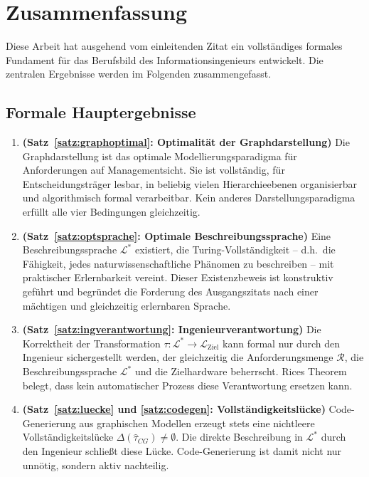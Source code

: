 ﻿\documentclass[a4paper,12pt]{article}
\theoremstyle{definition}
\begin{document}
\section{Zusammenfassung}
\label{sec:zusammenfassung}

Diese Arbeit hat ausgehend vom einleitenden Zitat ein vollständiges formales
Fundament für das Berufsbild des Informationsingenieurs entwickelt.
Die zentralen Ergebnisse werden im Folgenden zusammengefasst.

\subsection{Formale Hauptergebnisse}

\begin{enumerate}
  \item \textbf{(Satz~\ref{satz:graphoptimal}: Optimalität der Graphdarstellung)}
        Die Graphdarstellung ist das optimale Modellierungsparadigma für Anforderungen
        auf Managementsicht. Sie ist vollständig, für Entscheidungsträger lesbar,
        in beliebig vielen Hierarchieebenen organisierbar und algorithmisch formal
        verarbeitbar. Kein anderes Darstellungsparadigma erfüllt alle vier Bedingungen
        gleichzeitig.

  \item \textbf{(Satz~\ref{satz:optsprache}: Optimale Beschreibungssprache)}
        Eine Beschreibungssprache $\mathcal{L}^*$ existiert, die Turing-Vollständigkeit
        -- d.h.\ die Fähigkeit, jedes naturwissenschaftliche Phänomen zu beschreiben --
        mit praktischer Erlernbarkeit vereint. Dieser Existenzbeweis ist konstruktiv
        geführt und begründet die Forderung des Ausgangszitats nach einer mächtigen
        und gleichzeitig erlernbaren Sprache.

  \item \textbf{(Satz~\ref{satz:ingverantwortung}: Ingenieurverantwortung)}
        Die Korrektheit der Transformation $\tau: \mathcal{L}^* \to \mathcal{L}_{\text{Ziel}}$
        kann formal nur durch den Ingenieur sichergestellt werden, der gleichzeitig
        die Anforderungsmenge $\mathcal{R}$, die Beschreibungssprache $\mathcal{L}^*$
        und die Zielhardware beherrscht. Rices Theorem belegt, dass kein automatischer
        Prozess diese Verantwortung ersetzen kann.

  \item \textbf{(Satz~\ref{satz:luecke} und \ref{satz:codegen}: Vollständigkeitslücke)}
        Code-Generierung aus graphischen Modellen erzeugt stets eine nichtleere
        Vollständigkeitslücke $\Delta(\hat{\tau}_{CG}) \neq \emptyset$.
        Die direkte Beschreibung in $\mathcal{L}^*$ durch den Ingenieur schließt
        diese Lücke. Code-Generierung ist damit nicht nur unnötig, sondern aktiv nachteilig.


\end{enumerate}
\end{document}
